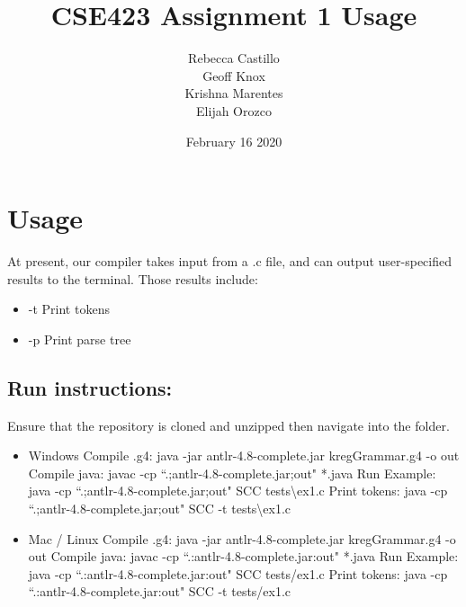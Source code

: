 \documentclass{article}
\title{CSE423 Assignment 1 Usage}
\author{Rebecca Castillo\\Geoff Knox\\Krishna Marentes\\Elijah Orozco}
\date{February 16 2020}
\begin{document}
\maketitle

\section{Usage}
At present, our compiler takes input from a .c file, and can output user-specified results to the terminal. Those results include:\\
\begin{itemize}
    \item -t Print tokens
    \item -p Print parse tree
\end{itemize}

\subsection{Run instructions:}
Ensure that the repository is cloned and unzipped then navigate into the folder.
\begin{itemize}
    \item Windows
        \subitem Compile .g4: java -jar antlr-4.8-complete.jar kregGrammar.g4 -o out
        \subitem Compile java: javac -cp ``.;antlr-4.8-complete.jar;out" *.java
        \subitem Run Example: java -cp ``.;antlr-4.8-complete.jar;out" SCC tests\textbackslash ex1.c
        \subitem Print tokens: java -cp ``.;antlr-4.8-complete.jar;out" SCC -t tests\textbackslash ex1.c
    \item Mac / Linux
        \subitem Compile .g4: java -jar antlr-4.8-complete.jar kregGrammar.g4 -o out
        \subitem Compile java: javac -cp ``.:antlr-4.8-complete.jar:out" *.java
        \subitem Run Example: java -cp ``.:antlr-4.8-complete.jar:out" SCC tests/ex1.c
        \subitem Print tokens: java -cp ``.:antlr-4.8-complete.jar:out" SCC -t tests/ex1.c
\end{itemize}
\end{document}
